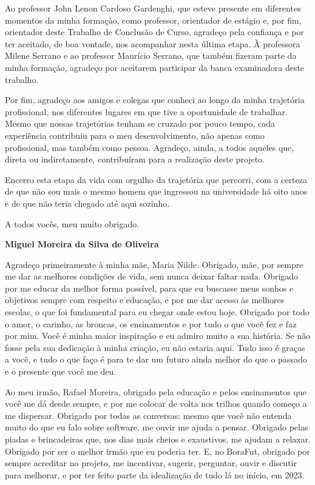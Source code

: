 \begin{agradecimentos}
Ao professor John Lenon Cardoso Gardenghi, que esteve presente em diferentes momentos da minha formação, como professor, orientador de estágio e, por fim, orientador deste Trabalho de Conclusão de Curso, agradeço pela confiança e por ter aceitado, de boa vontade, nos acompanhar nesta última etapa. À professora Milene Serrano e ao professor Maurício Serrano, que também fizeram parte da minha formação, agradeço por aceitarem participar da banca examinadora deste trabalho.

Por fim, agradeço aos amigos e colegas que conheci ao longo da minha trajetória profissional, nos diferentes lugares em que tive a oportunidade de trabalhar. Mesmo que nossas trajetórias tenham se cruzado por pouco tempo, cada experiência contribuiu para o meu desenvolvimento, não apenas como profissional, mas também como pessoa. Agradeço, ainda, a todos aqueles que, direta ou indiretamente, contribuíram para a realização deste projeto.

Encerro esta etapa da vida com orgulho da trajetória que percorri, com a certeza de que não sou mais o mesmo homem que ingressou na universidade há oito anos e de que não teria chegado até aqui sozinho.

A todos vocês, meu muito obrigado.

\newpage

\begin{center}
\textbf{Miguel Moreira da Silva de Oliveira}
\end{center}

Agradeço primeiramente à minha mãe, Maria Nilde. Obrigado, mãe, por sempre me dar as melhores condições de vida, sem nunca deixar faltar nada. Obrigado por me educar da melhor forma possível, para que eu buscasse meus sonhos e objetivos sempre com respeito e educação, e por me dar acesso às melhores escolas, o que foi fundamental para eu chegar onde estou hoje. Obrigado por todo o amor, o carinho, as broncas, os ensinamentos e por tudo o que você fez e faz por mim. Você é minha maior inspiração e eu admiro muito a sua história. Se não fosse pela sua dedicação à minha criação, eu não estaria aqui. Tudo isso é graças a você, e tudo o que faço é para te dar um futuro ainda melhor do que o passado e o presente que você me deu.

Ao meu irmão, Rafael Moreira, obrigado pela educação e pelos ensinamentos que você me dá desde sempre, e por me colocar de volta nos trilhos quando começo a me dispersar. Obrigado por todas as conversas: mesmo que você não entenda muito do que eu falo sobre software, me ouvir me ajuda a pensar. Obrigado pelas piadas e brincadeiras que, nos dias mais cheios e exaustivos, me ajudam a relaxar. Obrigado por ser o melhor irmão que eu poderia ter. E, no BoraFut, obrigado por sempre acreditar no projeto, me incentivar, sugerir, perguntar, ouvir e discutir para melhorar, e por ter feito parte da idealização de tudo lá no início, em 2023.


\end{agradecimentos}
